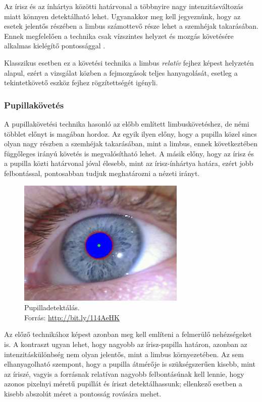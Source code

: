 Az írisz és az ínhártya közötti határvonal a többnyire nagy intenzitásváltozás miatt könnyen detektálható lehet. Ugyanakkor meg kell jegyeznünk, hogy az esetek jelentős részében a limbus számottevő része lehet a szemhéjak takarásában. Ennek megfelelően a technika csak vízszintes helyzet és mozgás követésére alkalmas kielégítő pontossággal \cite{scott}.

Klasszikus esetben ez a követési technika a limbus \emph{relatív} fejhez képest helyzetén alapul, ezért a vizsgálat közben a fejmozgások teljes hanyagolását, esetleg a tekintetkövető eszköz fejhez rögzítettségét igényli.

\subsubsection{Pupillakövetés}\label{sect:pupilla}

A pupillakövetési technika hasonló az előbb említett limbuskövetéshez, de némi többlet előnyt is magában hordoz. Az egyik ilyen előny, hogy a pupilla közel sincs olyan nagy részben a szemhéjak takarásában, mint a limbus, ennek következtében függőleges irányú követés is megvalósítható lehet. A másik előny, hogy az írisz és a pupilla közti határvonal jóval élesebb, mint az írisz-ínhártya határa, ezért jobb felbontással, pontosabban tudjuk meghatározni a nézeti irányt.

\begin{figure}[!ht]
\centering
\includegraphics[width=80mm, keepaspectratio]{figures/pupil_tracking.jpg}
\caption{Pupilladetektálás.\\Forrás: \url{http://bit.ly/114AeHK}}
\label{fig:pupiltrack}
\end{figure}

Az előző technikához képest azonban meg kell említeni a felmerülő nehézségeket is. A kontraszt ugyan lehet, hogy nagyobb az írisz-pupilla határon, azonban az intenzitáskülönbség nem olyan jelentős, mint a limbus környezetében. Az sem elhanyagolható szempont, hogy a pupilla átmérője is szükségszerűen kisebb, mint az íriszé, vagyis a forrásnak relatívan nagyobb felbontásúnak kell lennie, hogy azonos pixelnyi méretű pupillát és íriszt detektálhassunk; ellenkező esetben a kisebb abszolút méret a pontosság rovására mehet.

